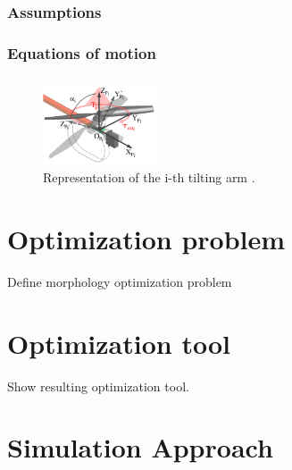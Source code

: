 \subsubsection{Assumptions}
\label{sec:assumptions}
\subsubsection{Equations of motion}
\label{sec:equations}
\subsubsection{}
\label{sec:assumptions}

\begin{figure}[h]
  \centering
  \includegraphics[width=0.3\textwidth]{images/tilt_model.png}
  \caption{Representation of the i-th tilting arm \citep{ryll_modeling_2012}.}
  \label{fig:hexacopter}
\end{figure}

\section{Optimization problem}
\label{sec:optimization_problem}
Define morphology optimization problem

\section{Optimization tool}
\label{sec:optimization_tool}
Show resulting optimization tool.

\section{Simulation Approach}
\label{sec:control_approach}
